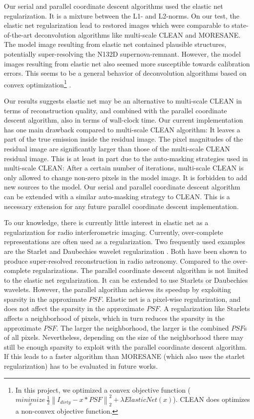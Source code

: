 Our serial and parallel coordinate descent algorithms used the elastic net regularization. It is a mixture between the L1- and L2-norms. On our test, the elastic net regularization lead to restored images which were comparable to state-of-the-art deconvolution algorithms like multi-scale CLEAN and MORESANE. The model image resulting from elastic net contained plausible structures, potentially super-resolving the N132D supernova-remnant. However, the model images resulting from elastic net also seemed more susceptible towards calibration errors. This seems to be a general behavior of deconvolution algorithms based on convex optimization\footnote{In this project, we optimized a convex objective function ($\underset{x}{minimize} \: \frac{1}{2} \left \| I_{dirty} - x * PSF \right \|_2^2 + \lambda ElasticNet(x)$). CLEAN does optimizes a non-convex objective function.} \cite{offringa2017optimized}.

Our results suggests elastic net may be an alternative to multi-scale CLEAN in terms of reconstruction quality, and combined with the parallel coordinate descent algorithm, also in terms of wall-clock time. Our current implementation has one main drawback compared to multi-scale CLEAN algorithm: It leaves  a part of the true emission inside the residual image. The pixel magnitudes of the residual image are significantly larger than those of the multi-scale CLEAN residual image. This is at least in part due to the auto-masking strategies used in multi-scale CLEAN: After a certain number of iterations, multi-scale CLEAN is only allowed to change non-zero pixels in the model image. It is forbidden to add new sources to the model. Our serial and parallel coordinate descent algorithm can be extended with a similar auto-masking strategy to CLEAN. This is a necessary extension for any future parallel coordinate descent implementation.

To our knowledge, there is currently little interest in elastic net as a regularization for radio interferometric imaging. Currently, over-complete representations are often used as a regularization. Two frequently used examples are the Starlet \cite{starck2015starlet} and Daubechies wavelet regularization \cite{carrillo2014purify}. Both have been shown to produce super-resolved reconstruction in radio astronomy\cite{girard2015sparse, dabbech2018cygnus}. Compared to the over-complete regularizations. The parallel coordinate descent algorithm is not limited to the elastic net regularization. It can be extended to use Starlets or Daubechies wavelets. However, the parallel algorithm achieves its speedup by exploiting sparsity in the approximate $PSF$. Elastic net is a pixel-wise regularization, and does not affect the sparsity in the approximate $PSF$. A regularization like Starlets affects a neighborhood of pixels, which in turn reduces the sparsity in the approximate $PSF$. The larger the neighborhood, the larger is the combined $PSF$s of all pixels. Nevertheless, depending on the size of the neighborhood there may still be enough sparsity to exploit with the parallel coordinate descent algorithm. If this leads to a faster algorithm than MORESANE (which also uses the starlet regularization) has to be evaluated in future works.

